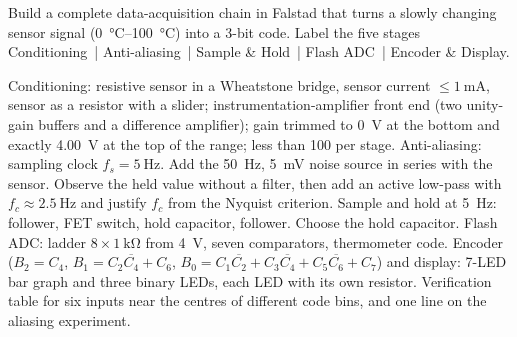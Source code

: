 \label{ex:capstone}
Build a complete data-acquisition chain in Falstad that turns a slowly
changing sensor signal (\SIrange{0}{100}{\celsius}) into a 3-bit code. Label
the five stages Conditioning~| Anti-aliasing~| Sample \& Hold~| Flash ADC~|
Encoder \& Display.
\begin{talist}
\ta Conditioning: resistive sensor in a Wheatstone bridge, sensor current
	$\leq\SI{1}{\milli\ampere}$, sensor as a resistor with a slider;
	instrumentation-amplifier front end (two unity-gain buffers and a
	difference amplifier); gain trimmed to \SI{0}{\volt} at the bottom and
	exactly \SI{4.00}{\volt} at the top of the range; less than 100 per stage.
\ta Anti-aliasing: sampling clock $f_s=\SI{5}{\hertz}$. Add the
	\SI{50}{\hertz}, \SI{5}{\milli\volt} noise source in series with the
	sensor. Observe the held value without a filter, then add an active
	low-pass with $f_c\approx\SI{2.5}{\hertz}$ and justify $f_c$ from the
	Nyquist criterion.
\ta Sample and hold at \SI{5}{\hertz}: follower, FET switch, hold capacitor,
	follower. Choose the hold capacitor.
\ta Flash ADC: ladder $8\times\SI{1}{\kilo\ohm}$ from \SI{4}{\volt}, seven
	comparators, thermometer code.
\ta Encoder ($B_2 = C_4$, $B_1 = C_2\overline{C_4} + C_6$,
	$B_0 = C_1\overline{C_2} + C_3\overline{C_4} + C_5\overline{C_6} + C_7$)
	and display: 7-LED bar graph and three binary LEDs, each LED with its own
	resistor.
\ta Verification table for six inputs near the centres of different code
	bins, and one line on the aliasing experiment.
\end{talist}

